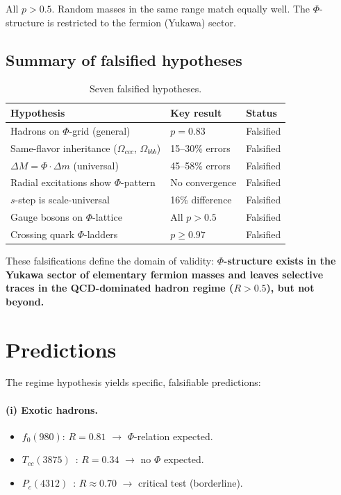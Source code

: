 \documentclass[11pt,a4paper]{article}
\begin{document}
\noindent
All $p > 0.5$. Random masses in the same range match equally well.
The $\Phi$-structure is restricted to the fermion (Yukawa) sector.

\subsection{Summary of falsified hypotheses}
\label{sec:falsified}

\begin{table}[H]
\centering
\caption{Seven falsified hypotheses.}
\label{tab:falsified}
\begin{tabular}{@{}lll@{}}
\toprule
Hypothesis & Key result & Status \\
\midrule
Hadrons on $\Phi$-grid (general)        & $p = 0.83$       & Falsified \\
Same-flavor inheritance ($\Omega_{ccc}$, $\Omega_{bbb}$)
                                         & 15--30\% errors  & Falsified \\
$\Delta M = \Phi \cdot \Delta m$ (universal)
                                         & 45--58\% errors  & Falsified \\
Radial excitations show $\Phi$-pattern   & No convergence   & Falsified \\
$s$-step is scale-universal              & 16\% difference  & Falsified \\
Gauge bosons on $\Phi$-lattice           & All $p > 0.5$    & Falsified \\
Crossing quark $\Phi$-ladders            & $p \geq 0.97$    & Falsified \\
\bottomrule
\end{tabular}
\end{table}

\noindent
These falsifications define the domain of validity:
\textbf{$\Phi$-structure exists in the Yukawa sector of elementary
fermion masses and leaves selective traces in the QCD-dominated hadron
regime ($R > 0.5$), but not beyond.}

\section{Predictions}
\label{sec:predictions}

The regime hypothesis yields specific, falsifiable predictions:

\paragraph{(i) Exotic hadrons.}
\begin{itemize}
  \item $f_0(980)$: $R = 0.81$ $\to$ $\Phi$-relation expected.
  \item $T_{cc}(3875)$~\cite{LHCbTcc2022}: $R = 0.34$ $\to$ no $\Phi$ expected.
  \item $P_c(4312)$~\cite{LHCbPc2019}: $R \approx 0.70$ $\to$ critical test (borderline).
\end{itemize}
\end{document}
